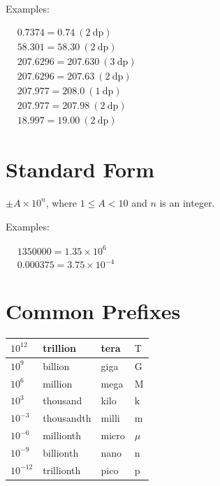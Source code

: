 \documentclass[twocolumn]{article}
\begin{document}
\noindent 
Examples:

\noindent
$
\begin{aligned}
	& 0.7374=0.74 \ (2 \ \mathrm{dp}) \\
	& 58.301=58.30 \ (2 \ \mathrm{dp}) \\
	& 207.6296=207.630 \ (3 \ \mathrm{dp}) \\
	& 207.6296=207.63 \ (2 \ \mathrm{dp}) \\
    & 207.977=208.0 \ (1 \ \mathrm{dp}) \\
    & 207.977=207.98 \ (2 \ \mathrm{dp}) \\
    & 18.997=19.00 \ (2 \ \mathrm{dp})
\end{aligned}
$

\section*{Standard Form}

\noindent
$\pm A \times 10^n$, where $1 \leq A < 10$ and $n$ is an integer.

\bigskip 

\noindent
Examples:

\noindent
$
\begin{aligned}
	& 1350000=1.35 \times 10^6 \\
	& 0.000375=3.75 \times 10^{-4}
\end{aligned}
$

\section*{Common Prefixes}

\begin{tabular}{|l|l|l|l|}
	\hline $10^{12}$ & trillion & tera & $\mathrm{T}$ \\
	\hline $10^9$ & billion & giga & $\mathrm{G}$ \\
	\hline $10^6$ & million & mega & $\mathrm{M}$ \\
	\hline $10^3$ & thousand & kilo & $\mathrm{k}$ \\
	\hline $10^{-3}$ & thousandth & milli & $\mathrm{m}$ \\
	\hline $10^{-6}$ & millionth & micro & $\mu$ \\
	\hline $10^{-9}$ & billionth & nano & $\mathrm{n}$ \\
	\hline $10^{-12}$ & trillionth & pico & $\mathrm{p}$ \\
	\hline
\end{tabular}
\end{document}
